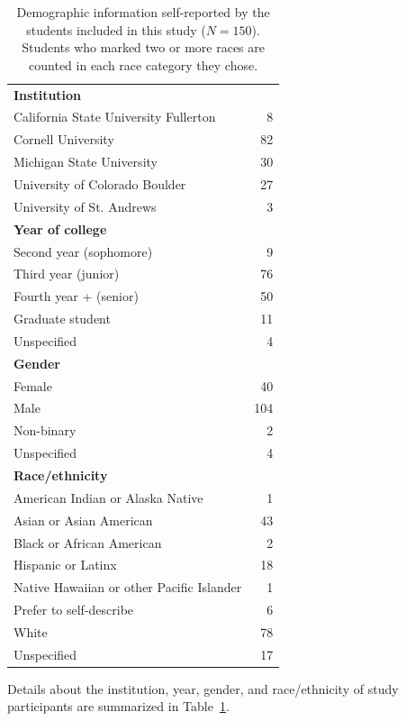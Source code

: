 \documentclass[english,aps,prstper,reprint,showpacs,longbibliography,superscriptaddress,nofootinbib]{revtex4-2}
\begin{document}
\begin{table}[tb] 
  \caption{Demographic information self-reported by the students included in this study ($N=150$). Students who marked two or more races are counted in each race category they chose.}
  \label{ta:demographics}
  \begin{ruledtabular}
    \begin{tabular}{lr}
    \textbf{Institution} & \\
    \quad California State University Fullerton & 8\\
    \quad Cornell University & 82\\
    \quad Michigan State University & 30\\
    \quad University of Colorado Boulder & 27\\
    \quad University of St. Andrews & 3\\
    \textbf{Year of college} \\
    \quad Second year (sophomore) & 9\\
    \quad Third year (junior) & 76\\
    \quad Fourth year + (senior) & 50\\
    \quad Graduate student & 11\\
    \quad Unspecified & 4\\
    \textbf{Gender}\\
    \quad Female & 40\\
    \quad Male & 104\\
    \quad Non-binary & 2\\
    \quad Unspecified & 4\\
    \textbf{Race/ethnicity}\\
    \quad American Indian or Alaska Native & 1\\
    \quad Asian or Asian American & 43 \\
    \quad Black or African American & 2 \\
    \quad Hispanic or Latinx & 18 \\
    \quad Native Hawaiian or other Pacific Islander & 1\\
    \quad Prefer to self-describe & 6\\
    \quad White & 78\\
    \quad Unspecified & 17\\
    \end{tabular}
  \end{ruledtabular}
\end{table}

Details about the institution, year, gender, and race/ethnicity of study participants are summarized in Table~\ref{ta:demographics}.
\end{document}
